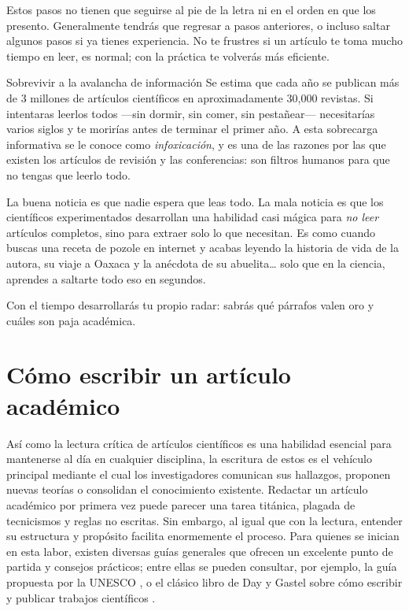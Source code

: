 Estos pasos no tienen que seguirse al pie de la letra ni en el orden en que los presento.
Generalmente tendrás que regresar a pasos anteriores, o incluso saltar algunos pasos si ya tienes experiencia.
No te frustres si un artículo te toma mucho tiempo en leer, es normal; con la práctica te volverás más eficiente.

\begin{digress}{Sobrevivir a la avalancha de información}
	Se estima que cada año se publican más de 3 millones de artículos científicos en aproximadamente 30,000 revistas.
	Si intentaras leerlos todos —sin dormir, sin comer, sin pestañear— necesitarías varios siglos y te morirías antes de terminar el primer año.
	A esta sobrecarga informativa se le conoce como \emph{infoxicación}, y es una de las razones por las que existen los artículos de revisión y las conferencias: son filtros humanos para que no tengas que leerlo todo.

	La buena noticia es que nadie espera que leas todo.
	La mala noticia es que los científicos experimentados desarrollan una habilidad casi mágica para \emph{no leer} artículos completos, sino para extraer solo lo que necesitan.
	Es como cuando buscas una receta de pozole en internet y acabas leyendo la historia de vida de la autora, su viaje a Oaxaca y la anécdota de su abuelita… solo que en la ciencia, aprendes a saltarte todo eso en segundos.

	Con el tiempo desarrollarás tu propio radar: sabrás qué párrafos valen oro y cuáles son paja académica.
\end{digress}

\section{Cómo escribir un artículo académico}
\label{sec:comoescribir}

Así como la lectura crítica de artículos científicos es una habilidad esencial para mantenerse al día en cualquier disciplina, la escritura de estos es el vehículo principal mediante el cual los investigadores comunican sus hallazgos, proponen nuevas teorías o consolidan el conocimiento existente.
Redactar un artículo académico por primera vez puede parecer una tarea titánica, plagada de tecnicismos y reglas no escritas.
Sin embargo, al igual que con la lectura, entender su estructura y propósito facilita enormemente el proceso.
Para quienes se inician en esta labor, existen diversas guías generales que ofrecen un excelente punto de partida y consejos prácticos; entre ellas se pueden consultar, por ejemplo, la guía propuesta por la UNESCO \cite{Unesco1983GuiaRedaccion}, o el clásico libro de Day y Gastel sobre cómo escribir y publicar trabajos científicos \cite{DayGastel2022HowToWrite}.

